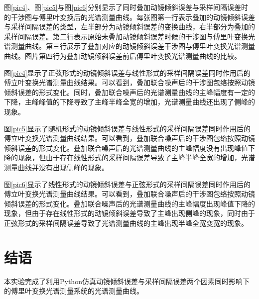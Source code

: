 \documentclass[conference]{IEEEtran}
\begin{document}
图\ref{pic4}、图\ref{pic5}与图\ref{pic6}分别显示了同时叠加动镜倾斜误差与采样间隔误差时的干涉图与傅里叶变换后的光谱测量曲线。每张图第一行表示叠加的动镜倾斜误差与采样间隔误差的类型，左半部分为动镜倾斜误差的变换曲线，右半部分为叠加的采样间隔误差。第二行表示原始未叠加动镜倾斜误差时候的干涉图与傅里叶变换光谱测量曲线。第三行展示了叠加对应的动镜倾斜误差干涉图与傅里叶变换光谱测量曲线。图片第四行为叠加动镜倾斜误差前后傅里叶变换光谱测量曲线的比较。

图\ref{pic4}显示了正弦形式的动镜倾斜误差与线性形式的采样间隔误差同时作用后的傅立叶变换光谱测量曲线结果。可以看到，叠加联合噪声后的干涉图包络按照动镜倾斜误差的形式变化。同时，叠加联合噪声后的光谱测量曲线的主峰幅度有一定的下降，主峰峰值的下降导致了主峰半峰全宽的增加，光谱测量曲线还出现了侧峰的现象。

图\ref{pic5}显示了随机形式的动镜倾斜误差与线性形式的采样间隔误差同时作用后的傅立叶变换光谱测量曲线结果。可以看到，叠加联合噪声后的干涉图包络按照动镜倾斜误差的形式变化。叠加联合噪声后的光谱测量曲线的主峰幅度没有出现峰值下降的现象，但由于存在线性形式的采样间隔误差导致了主峰半峰全宽的增加，光谱测量曲线并没有出现侧峰的现象。

图\ref{pic6}显示了线性形式的动镜倾斜误差与正弦形式的采样间隔误差同时作用后的傅立叶变换光谱测量曲线结果。可以看到，叠加联合噪声后的干涉图包络按照动镜倾斜误差的形式变化。叠加联合噪声后的光谱测量曲线的主峰幅度出现峰值下降的现象，但由于存在线性形式的动镜倾斜误差导致了主峰出现侧峰的现象，同时由于正弦形式的采样间隔误差导致了光谱测量曲线的主峰出现半峰全宽变宽的现象。

\section{结语}
本实验完成了利用Python仿真动镜倾斜误差与采样间隔误差两个因素同时影响下的傅里叶变换光谱测量系统的光谱测量曲线。
\end{document}

